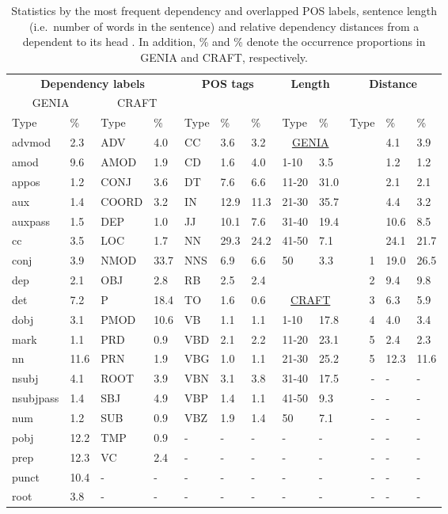 \documentclass[twocolumn,hyperref]{bmcart}\pdfoutput=1
\begin{document}
\begin{table*}[!t]
\centering
\caption{Statistics   by the most frequent dependency and overlapped POS labels, sentence length (i.e.\ number of words in the sentence) and relative dependency distances  from a dependent  to its head . In addition,  \% and  \% denote the occurrence proportions in GENIA and CRAFT, respectively.} 
\def\arraystretch{1.05}
\begin{tabular}{ll|ll|lll|ll|rll}
\hline
 \multicolumn{4}{c|}{\bf Dependency labels} &  \multicolumn{3}{c|}{\multirow{2}{*}{\bf POS tags}} &  \multicolumn{2}{c|}{\multirow{2}{*}{\bf Length}} &  \multicolumn{3}{c}{\multirow{2}{*}{\bf Distance}}\\
\cline{1-4}
\multicolumn{2}{c|}{GENIA} & \multicolumn{2}{c|}{CRAFT} & & &  & & & &  \\
\hline
Type & \%  &   Type & \%  & Type & \% & \% & Type & \% & Type & \% & \%    \\
\hline
advmod & 2.3 &  ADV & 4.0 & CC & 3.6  & 3.2 & \multicolumn{2}{c|}{\underline{GENIA}}  &    & 4.1 & 3.9 \\
amod & 9.6 &  AMOD & 1.9 &CD & 1.6 & 4.0 & 1-10 & 3.5 &   &  1.2 & 1.2 \\ 
appos & 1.2 & CONJ & 3.6 &DT & 7.6 & 6.6 &11-20 & 31.0 &   & 2.1 & 2.1\\ 
aux & 1.4 & COORD & 3.2 &IN & 12.9 & 11.3  &21-30 & 35.7 &  & 4.4 & 3.2  \\ 
auxpass & 1.5 &DEP & 1.0 &JJ & 10.1 & 7.6  & 31-40 & 19.4 &   & 10.6 & 8.5  \\ 
cc & 3.5 &LOC & 1.7 &NN & 29.3& 24.2  &41-50 & 7.1 &  &  24.1 &  21.7 \\ 
conj & 3.9 &NMOD & 33.7 &NNS & 6.9 & 6.6 &   50 & 3.3 &  1 &  19.0 &  26.5 \\
dep & 2.1 &OBJ & 2.8 &RB & 2.5 & 2.4 &  &   & 2 & 9.4 & 9.8  \\
det & 7.2 & P & 18.4 &TO & 1.6 & 0.6  & \multicolumn{2}{c|}{\underline{CRAFT}}  & 3 & 6.3  &  5.9 \\
dobj & 3.1 &PMOD & 10.6 &VB & 1.1  & 1.1 &1-10 & 17.8 & 4 & 4.0  & 3.4  \\
mark & 1.1 &  PRD & 0.9 & VBD & 2.1& 2.2 & 11-20 & 23.1 &  5 &2.4  & 2.3 \\
nn & 11.6 &PRN & 1.9 &VBG & 1.0& 1.1 &  21-30 & 25.2 &  5 & 12.3  & 11.6  \\ 
nsubj & 4.1 &ROOT & 3.9 &VBN & 3.1& 3.8 &31-40 & 17.5 & - & -  & - \\ 
nsubjpass & 1.4 &SBJ & 4.9 &VBP & 1.4  & 1.1 &41-50 & 9.3 &  - & -  & -\\ 
num & 1.2 &SUB & 0.9 & VBZ & 1.9  & 1.4 &   50 & 7.1 & - & -  & - \\ 
pobj & 12.2 &TMP & 0.9 & - & - & -& - & - & - & -  & - \\prep & 12.3 &VC & 2.4 & - & - & - & - & - & - & -  & - \\ 
punct & 10.4 & - & - &  - & - & - & - & -& - & -  & - \\ 
root & 3.8 & - & - &  - & - & - & - & -& - & -  & - \\ 
\hline
\end{tabular}
\label{tab:statistics}
\end{table*}
\end{document}
